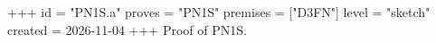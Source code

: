 +++
id = "PN1S.a"
proves = "PN1S"
premises = ["D3FN"]
level = "sketch"
created = 2026-11-04
+++
Proof of PN1S.
